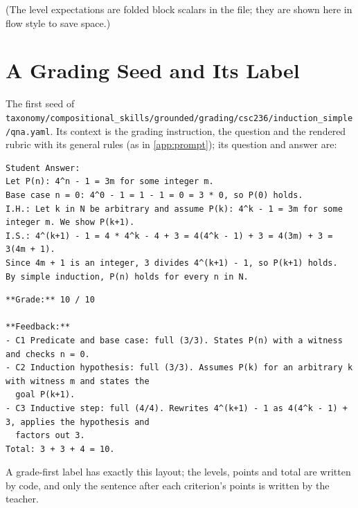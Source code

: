 \documentclass[11pt,a4paper]{article}
\newcommand{\file}[1]{\nolinkurl{#1}}
\theoremstyle{definition}
\begin{document}
(The level expectations are folded block scalars in the file; they are shown here in flow style to save space.)

\section{A Grading Seed and Its Label}\label{app:seed}
The first seed of \file{taxonomy/compositional_skills/grounded/grading/csc236/induction_simple/qna.yaml}. Its context is the grading instruction, the question and the rendered rubric with its general rules (as in \cref{app:prompt}); its question and answer are:
\begin{lstlisting}
Student Answer:
Let P(n): 4^n - 1 = 3m for some integer m.
Base case n = 0: 4^0 - 1 = 1 - 1 = 0 = 3 * 0, so P(0) holds.
I.H.: Let k in N be arbitrary and assume P(k): 4^k - 1 = 3m for some integer m. We show P(k+1).
I.S.: 4^(k+1) - 1 = 4 * 4^k - 4 + 3 = 4(4^k - 1) + 3 = 4(3m) + 3 = 3(4m + 1).
Since 4m + 1 is an integer, 3 divides 4^(k+1) - 1, so P(k+1) holds.
By simple induction, P(n) holds for every n in N.
\end{lstlisting}
\begin{lstlisting}
**Grade:** 10 / 10

**Feedback:**
- C1 Predicate and base case: full (3/3). States P(n) with a witness and checks n = 0.
- C2 Induction hypothesis: full (3/3). Assumes P(k) for an arbitrary k with witness m and states the
  goal P(k+1).
- C3 Inductive step: full (4/4). Rewrites 4^(k+1) - 1 as 4(4^k - 1) + 3, applies the hypothesis and
  factors out 3.
Total: 3 + 3 + 4 = 10.
\end{lstlisting}
A grade-first label has exactly this layout; the levels, points and total are written by code, and only the sentence after each criterion's points is written by the teacher.
\end{document}
